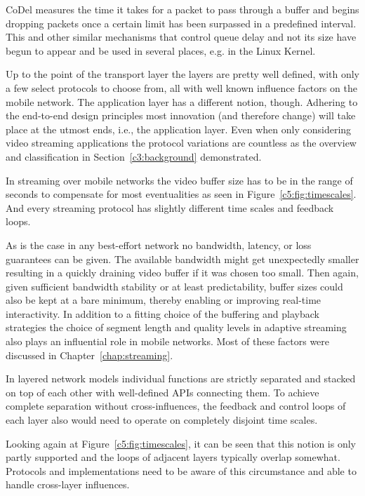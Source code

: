 CoDel measures the time it takes for a packet to pass through a buffer and begins dropping packets once a certain limit has been surpassed in a predefined interval. This and other similar mechanisms that control queue delay and not its size have begun to appear and be used in several places, e.g. in the Linux Kernel.

Up to the point of the transport layer the layers are pretty well defined, with only a few select protocols to choose from, all with well known influence factors on the mobile network. The application layer has a different notion, though. Adhering to the end-to-end design principles most innovation (and therefore change) will take place at the utmost ends, i.e., the application layer. Even when only considering video streaming applications the protocol variations are countless as the overview and classification in Section~\ref{c3:background} demonstrated. 

In streaming over mobile networks the video buffer size has to be in the range of seconds to compensate for most eventualities as seen in Figure~\ref{c5:fig:timescales}. And every streaming protocol has slightly different time scales and feedback loops.

As is the case in any best-effort network no bandwidth, latency, or loss guarantees can be given. The available bandwidth might get unexpectedly smaller resulting in a quickly draining video buffer if it was chosen too small. Then again, given sufficient bandwidth stability or at least predictability, buffer sizes could also be kept at a bare minimum, thereby enabling or improving real-time interactivity. In addition to a fitting choice of the buffering and playback strategies the choice of segment length and quality levels in adaptive streaming also plays an influential role in mobile networks. Most of these factors were discussed in Chapter~\ref{chap:streaming}.

In layered network models individual functions are strictly separated and stacked on top of each other with well-defined \glspl{API} connecting them. To achieve complete separation without cross-influences, the feedback and control loops of each layer also would need to operate on completely disjoint time scales.

Looking again at Figure~\ref{c5:fig:timescales}, it can be seen that this notion is only partly supported and the loops of adjacent layers typically overlap somewhat. Protocols and implementations need to be aware of this circumstance and able to handle cross-layer influences.


